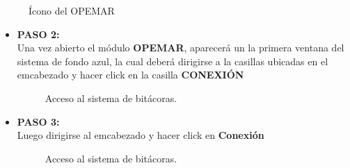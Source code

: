 \documentclass[a4paper,oneside,11pt]{book}
\begin{document}
 \begin{figure}[!h]
 \begin{center} 
 \caption{Ícono del OPEMAR}
\end{center}
 \end{figure}

\newpage


\begin{itemize}
\item\textbf{PASO 2:} \\
Una vez abierto el módulo \textbf{OPEMAR}, aparecerá un la primera ventana del sistema de fondo azul, la cual deberá dirigirse a la casillas ubicadas en el emcabezado y hacer click en la casilla \textbf{CONEXIÓN}


\begin{figure} [!h]
\begin{center}
 \caption{Acceso al sistema de bitácoras.}
\end{center}
 \end{figure}
 

\item\textbf{PASO 3:} \\
Luego dirigirse al emcabezado y hacer click en \textbf{Conexión}

\begin{figure} [!h]
\begin{center}
 \caption{Acceso al sistema de bitácoras.}
\end{center}
 \end{figure}
  

\end{itemize}
\end{document}
